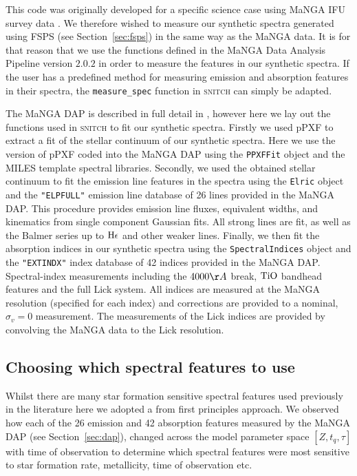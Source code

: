 \documentclass[useAMS,usenatbib]{mn2e}
\begin{document}
This code was originally developed for a specific science case using MaNGA IFU survey data \citep[an integral-field spectroscopic survey of 10,000 galaxies undertaken by the fourth phase of the Sloan Digital Sky Survey, SDSS-IV; ][]{bundy15}. We therefore wished to measure our synthetic spectra generated using FSPS (see Section~\ref{sec:fsps}) in the same way as the MaNGA data. It is for that reason that we use the functions defined in the MaNGA Data Analysis Pipeline \citep[DAP;][]{westfall18} version $2.0.2$ in order to measure the features in our synthetic spectra. If the user has a predefined method for measuring emission and absorption features in their spectra, the \texttt{measure\_spec} function in \textsc{snitch} can simply be adapted.

The MaNGA DAP is described in full detail in \cite{westfall18}, however here we lay out the functions used in \textsc{snitch} to fit our synthetic spectra. Firstly we used pPXF \citep{cappellari04} to extract a fit of the stellar continuum of our synthetic spectra. Here we use the version of pPXF coded into the MaNGA DAP using the \texttt{PPXFFit} object and the MILES template spectral libraries. Secondly, we used the obtained stellar continuum to fit the emission line features in the spectra using the \texttt{Elric} object and the \texttt{"ELPFULL"} emission line database of 26 lines provided in the MaNGA DAP. This procedure provides emission line fluxes, equivalent widths, and kinematics from single component Gaussian fits. All strong lines are fit, as well as the Balmer series up to $\rm{H}\epsilon$ and other weaker lines. Finally, we then fit the absorption indices in our synthetic spectra using the \texttt{SpectralIndices} object and the \texttt{"EXTINDX"} index database of 42 indices provided in the MaNGA DAP. Spectral-index measurements including the $4000\AA$ break, $\rm{TiO}$ bandhead features and the full Lick system. All indices are measured at the MaNGA resolution (specified for each index) and corrections are provided to a nominal, $\sigma_v = 0$ measurement. The measurements of the Lick indices are provided by convolving the MaNGA data to the Lick resolution. 


\subsection{Choosing which spectral features to use}

Whilst there are many star formation sensitive spectral features used previously in the literature \citep{} here we adopted a from first principles approach. We observed how each of the 26 emission and 42 absorption features measured by the MaNGA DAP (see Section~\ref{sec:dap}), changed across the model parameter space $[Z, t_q, \tau]$ with time of observation to determine which spectral features were most sensitive to star formation rate, metallicity, time of observation etc. 
\end{document}
